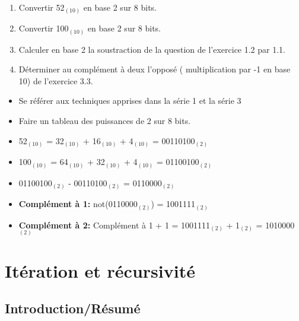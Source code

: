 \begin{Exercice}[Durée 5]\\
    \begin{enumerate}
        \item Convertir 52$_{(10)}$ en base 2 sur 8 bits.
        \item Convertir 100$_{(10)}$ en base 2 sur 8 bits.
        \item Calculer en base 2 la soustraction de la question de l'exercice 1.2 par 1.1.
        \item Déterminer au complément à deux l'opposé ( multiplication par -1 en base 10) de l'exercice 3.3.
    \end{enumerate}
\begin{conseil}
   \begin{itemize}
       \item Se référer aux techniques apprises dans la série 1 et la série 3
       \item Faire un tableau des puissances de 2 sur 8 bits.
   \end{itemize}
\end{conseil}
    
\begin{solution}
\begin{itemize}
    \item 52$_{(10)}$ = 32$_{(10)}$ + 16$_{(10)}$ + 4$_{(10)}$ = 00110100$_{(2)}$
    \item 100$_{(10)}$ = 64$_{(10)}$ + 32$_{(10)}$ + 4$_{(10)}$ = 01100100$_{(2)}$
    \item 01100100$_{(2)}$ - 00110100$_{(2)}$ = 0110000$_{(2)}$
    \item \textbf{Complément à 1:} not(0110000$_{(2)}$) = 1001111$_{(2)}$ 
    \item \textbf{Complément à 2:} Complément à 1 + 1 = 1001111$_{(2)}$ + 1$_{(2)}$ = 1010000$_{(2)}$
\end{itemize}   
\end{solution}

\end{Exercice}

\section{Itération et récursivité}

\subsection{Introduction/Résumé}

